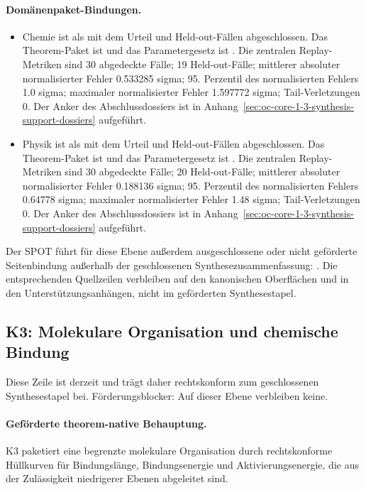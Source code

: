 \paragraph{Domänenpaket-Bindungen.}
\begin{itemize}[leftmargin=1.6em,nosep]
\item Chemie ist als  mit dem Urteil  und  Held-out-Fällen abgeschlossen. Das Theorem-Paket ist  und das Parametergesetz ist . Die zentralen Replay-Metriken sind 30 abgedeckte Fälle; 19 Held-out-Fälle; mittlerer absoluter normalisierter Fehler 0.533285 sigma; 95. Perzentil des normalisierten Fehlers 1.0 sigma; maximaler normalisierter Fehler 1.597772 sigma; Tail-Verletzungen 0. Der Anker des Abschlussdossiers ist in Anhang~\ref{sec:oc-core-1-3-synthesis-support-dossiers} aufgeführt.
\item Physik ist als  mit dem Urteil  und  Held-out-Fällen abgeschlossen. Das Theorem-Paket ist  und das Parametergesetz ist . Die zentralen Replay-Metriken sind 30 abgedeckte Fälle; 20 Held-out-Fälle; mittlerer absoluter normalisierter Fehler 0.188136 sigma; 95. Perzentil des normalisierten Fehlers 0.64778 sigma; maximaler normalisierter Fehler 1.48 sigma; Tail-Verletzungen 0. Der Anker des Abschlussdossiers ist in Anhang~\ref{sec:oc-core-1-3-synthesis-support-dossiers} aufgeführt.
\end{itemize}
Der SPOT führt für diese Ebene außerdem  ausgeschlossene oder nicht geförderte Seitenbindung außerhalb der geschlossenen Synthesezusammenfassung: . Die entsprechenden Quellzeilen verbleiben auf den kanonischen Oberflächen und in den Unterstützungsanhängen, nicht im geförderten Synthesestapel.

\subsection{K3: Molekulare Organisation und chemische Bindung}
\label{sec:oc-core-1-3-synthesis-k3}
Diese Zeile ist derzeit  und trägt daher rechtskonform zum geschlossenen Synthesestapel bei.
Förderungsblocker: Auf dieser Ebene verbleiben keine.

\paragraph{Geförderte theorem-native Behauptung.}
K3 paketiert eine begrenzte molekulare Organisation durch rechtskonforme Hüllkurven für Bindungslänge, Bindungsenergie und Aktivierungsenergie, die aus der Zulässigkeit niedrigerer Ebenen abgeleitet sind.

